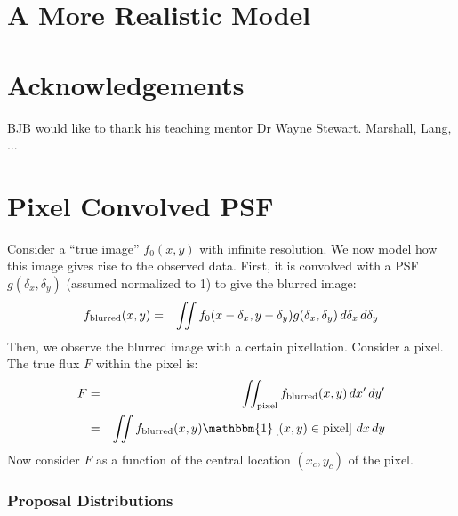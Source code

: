 \documentclass[letterpaper, 11pt]{article}
\begin{document}
\section{A More Realistic Model}
\citep{2008ApJ...682..874K}


\section{Acknowledgements}
BJB would like to thank his teaching mentor Dr Wayne Stewart.
Marshall, Lang, ...


\appendix
\section{Pixel Convolved PSF}
Consider a ``true image'' $f_0(x, y)$ with infinite resolution. We now model how
this image gives rise to the observed data. First, it is convolved with a
PSF $g(\delta_x, \delta_y)$ (assumed normalized to 1) to give the blurred image:
\begin{eqnarray}
f_{\rm{blurred}}(x, y) &=& \iint f_0(x-\delta_x, y-\delta_y)
g(\delta_x, \delta_y) \, d\delta_x \, d\delta_y \label{blur}
\end{eqnarray}
Then, we observe the blurred image with a certain pixellation. Consider a pixel.
The true flux $F$ within the pixel is:
\begin{eqnarray}
F &=& \iint_{\rm pixel} f_{\rm blurred}(x, y) \,dx'\,dy'\\
&=& \iint f_{\rm blurred}(x, y)\mathbbm{1}\left[(x,y) \in \textnormal{pixel}
\right] \,dx\,dy \label{pixel}
\end{eqnarray}
Now consider $F$ as a function of the central location $(x_c, y_c)$ of the
pixel.




\subsubsection{Proposal Distributions}
\end{document}
